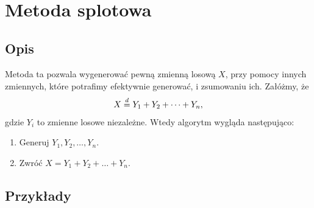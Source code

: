 \documentclass[12pt]{mwrep}
\begin{document}
%









	
	\section{Metoda splotowa\textsuperscript{\cite{splot}}}
	
	\subsection{Opis}
	\noindent Metoda ta pozwala wygenerować pewną zmienną losową $X$, przy pomocy innych zmiennych, które potrafimy efektywnie generować, i zsumowaniu ich. Załóżmy, że
	$$ X \buildrel{d} \over{=} Y_1 + Y_2 + \dots + Y_n, $$
	gdzie $Y_i$ to zmienne losowe niezależne. Wtedy algorytm wygląda następująco:
	\begin{enumerate}[leftmargin=10mm]
		\item Generuj $ Y_1, Y_2, \dots, Y_n $.
		\item Zwróć $ X = Y_1 + Y_2 + \dots + Y_n $.
	\end{enumerate}

	\subsection{Przykłady}
	
\end{document}

